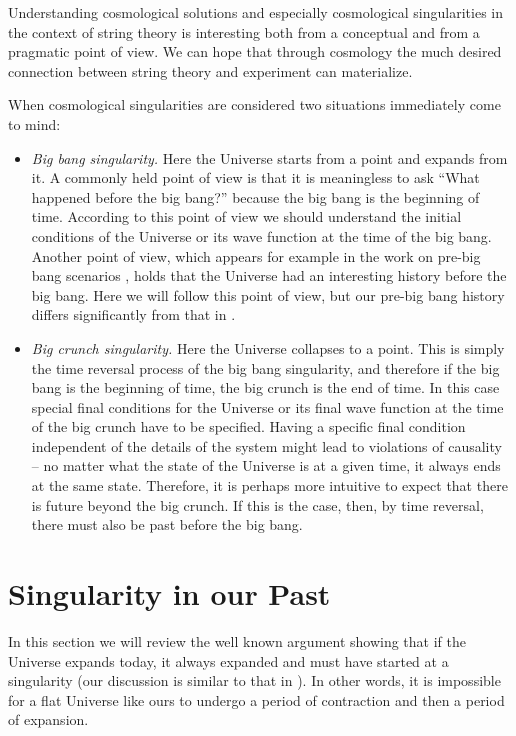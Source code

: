 \documentclass[a4paper,12pt,oneside]{article}
\begin{document}
Understanding cosmological solutions and especially cosmological
singularities in the context of string theory is interesting both
from a conceptual and from a pragmatic point of view.  We can
hope that through cosmology the much desired connection between
string theory and experiment can materialize.

When cosmological singularities are considered two situations
immediately come to mind:


\begin{itemize}
  \item
{\it Big bang singularity.}  Here the Universe starts from a point
and expands from it.  A commonly held point of view is that it is
meaningless to ask ``What happened before the big bang?'' because
the big bang is the beginning of time.  According to this point
of view we should understand the initial conditions of the
Universe or its wave function at the time of the big bang.
Another point of view, which appears for example in the work on
pre-big bang scenarios \cite{PBB}, holds that the Universe had an
interesting history before the big bang.  Here we will follow
this point of view, but our pre-big bang history differs
significantly from that in \cite{PBB}.

\item {\it Big crunch singularity.}  Here the Universe collapses to
a point.  This is simply the time reversal process of the big
bang singularity, and therefore if the big bang is the beginning
of time, the big crunch is the end of time.  In this case special
final conditions for the Universe or its final wave function at
the time of the big crunch have to be specified.  Having a
specific final condition independent of the details of the system
might lead to violations of causality -- no matter what the state
of the Universe is at a given time, it always ends at the same
state. Therefore, it is perhaps more intuitive to expect that
there is future beyond the big crunch.  If this is the case,
then, by time reversal, there must also be past before the big
bang.

\end{itemize}

\setcounter{equation}{0}
\section{Singularity in our Past}

In this section we will review the well known argument showing
that if the Universe expands today, it always expanded and must
have started at a singularity (our discussion is similar to that
in \cite{norev}). In other words, it is impossible for a flat
Universe like ours to undergo a period of contraction and then a
period of expansion.
\end{document}
